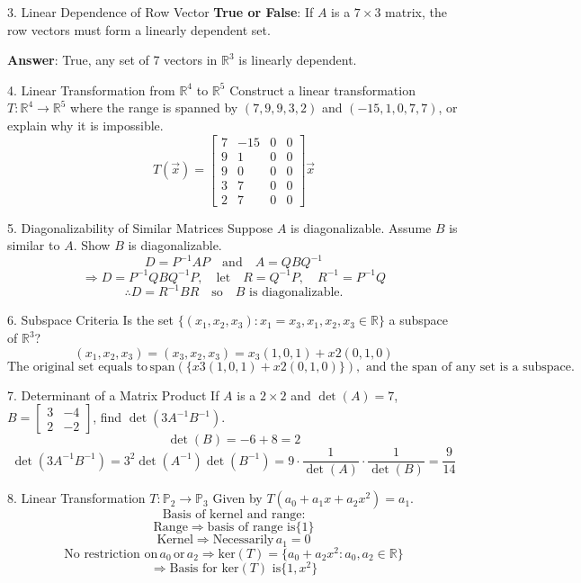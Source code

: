 \documentclass{article}
\begin{document}
3. Linear Dependence of Row Vector
\textbf{True or False}: If \( A \) is a \( 7 \times 3 \) matrix, the row vectors must form a linearly dependent set.

\textbf{Answer}: True, any set of 7 vectors in \( \mathbb{R}^3 \) is linearly dependent.

4. Linear Transformation from \( \mathbb{R}^4 \) to \( \mathbb{R}^5 \)
Construct a linear transformation \( T: \mathbb{R}^4 \rightarrow \mathbb{R}^5 \) where the range is spanned by \( (7, 9, 9, 3, 2) \) and \( (-15, 1, 0, 7, 7) \), or explain why it is impossible.
\[
T(\vec{x}) = \begin{bmatrix} 7 & -15 & 0 & 0 \\ 9 & 1 & 0 & 0 \\ 9 & 0 & 0 & 0 \\ 3 & 7 & 0 & 0 \\ 2 & 7 & 0 & 0 \end{bmatrix} \vec{x}
\]

5. Diagonalizability of Similar Matrices
Suppose \( A \) is diagonalizable. Assume \( B \) is similar to \( A \). Show \( B \) is diagonalizable.
\[
D = P^{-1}AP \quad \text{and} \quad A = QBQ^{-1}
\]
\[
\Rightarrow D = P^{-1}QBQ^{-1}P, \quad \text{let} \quad R = Q^{-1}P, \quad R^{-1} = P^{-1}Q
\]
\[
\therefore D = R^{-1}BR \quad \text{so} \quad B \text{ is diagonalizable}.
\]

6. Subspace Criteria
Is the set \( \{(x_1, x_2, x_3) : x_1 = x_3, x_1, x_2, x_3 \in \mathbb{R}\} \) a subspace of \( \mathbb{R}^3 \)?
\[
(x_1, x_2, x_3) = (x_3, x_2, x_3) = x_3(1, 0, 1) + x2(0, 1, 0)
\]
\[
\text{The original set equals to} \, \text{span}(\{x3(1, 0, 1) + x2(0, 1, 0)\}), \text{ and the span of any set is a subspace}.
\]

7. Determinant of a Matrix Product
If \( A \) is a \( 2 \times 2 \) and \( \det(A) = 7 \), \( B = \begin{bmatrix} 3 & -4 \\ 2 & -2 \end{bmatrix} \), find \( \det(3A^{-1}B^{-1}) \).
\[
\det(B) = -6 + 8 = 2
\]
\[
\det(3A^{-1}B^{-1}) = 3^2 \det(A^{-1}) \det(B^{-1}) = 9 \cdot \frac{1}{\det(A)} \cdot \frac{1}{\det(B)} = \frac{9}{14}
\]

8. Linear Transformation \( T: \mathbb{P}_2 \rightarrow \mathbb{P}_3 \)
Given by \( T(a_0 + a_1x + a_2x^2) = a_1 \).
\[
\text{Basis of kernel and range:}
\]
\[
\text{Range} \Rightarrow \text{basis of range is} \{1\}
\]
\[
\text{Kernel} \Rightarrow \text{Necessarily} \, a_1 = 0
\]
\[
\text{No restriction on} \, a_0 \, \text{or} \, a_2 \Rightarrow \text{ker}(T) = \{a_0 + a_2x^2 : a_0, a_2 \in \mathbb{R}\}
\]
\[
\Rightarrow \text{Basis for ker}(T) \text{ is} \{1, x^2\}
\]
\end{document}
